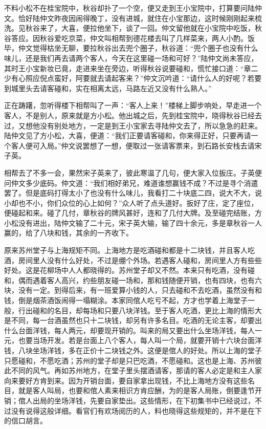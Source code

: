 \documentclass[12pt,UTF8]{ctexbook}
\begin{document}
{{{不料小松不在桂宝院中，秋谷却扑了一个空，便又走到王小宝院中，打算要问陆仲文。恰好陆仲文昨夜因闹得晚丁，没有进城，就住在小宝那边，这时候刚刚起来梳洗。见秋谷来了，大喜，便拉他坐下，谈了一回。仲文留他就在小宝院中吃饭，秋谷答应。因秋谷爱吃京菜，仲文叫相帮到德花楼去叫了几样菜来，两人小酌。饭毕，仲文觉得枯坐无聊，要拉秋谷出去兜个圈子，秋谷道：“兜个圈子也没有什么味儿，还是我们再去请两个客人，今天在这里碰一场和可好？”陆仲文尚未答应，其时王小宝新妆已竟，走进来坐在旁边，听得秋谷说要碰和，慌忙接口道：“章二少有心照应倪点蛮好，阿要就去请起客来？”仲文沉吟道：“请什么人的好呢？若要到城里头去请客碰和，实在相离太远，马路左近又没有什么熟人。”

正在踌躇，忽听得楼下相帮叫了一声：“客人上来！”楼梯上脚步响处，早走进一个客人，不是别人，原来就是方小松。他出城之后，先到桂宝院中，晓得秋谷已经去过，又想他没有别处地方，一定是到王小宝家去寻陆仲文去了，所以急急的赶来。陆仲文见了方小松，大喜，便道：“我们正要请客碰和，你来得正好，只要再请一个客人便可入局。”仲文说罢想了一想，便取过一张请客票来，到石路长安栈去请宋子英。

相帮去了不多一会，果然宋子英来了，彼此寒温了几句，便大家入位扳庄。子英便问仲文多少底码。仲文道：“我们相好弟兄，难道谁想赢钱不成？不过是寻个消遣罢了。但是底码打得太小了也没有什么味儿，我看打二十块底二四，说大不大，说小却也不小，你们众位的心上如何？”众人听了点头道好。扳好了庄，定了座位，便碰起和来。碰了几付，章秋谷的牌风甚好，连和了几付大牌。及至碰完结账，方小松没有进出，陆仲文输了二十元，宋子英大输，输了四十余元，多是章秋谷一人赢的，给了八块和钱，其余的一齐收下。

原来苏州堂子与上海规矩不同。上海地方是吃酒碰和都是十二块钱，并且客人吃酒，房间里人没有什么好处，不过是绷个外场。若遇客人碰和，房间里人方有些些好处。这是花柳场中人人都晓得的。苏州堂子却又不然。本来只有吃酒，没有碰和，偶而遇着客人高兴，约些朋友碰一场和，那和钱随便开销，也有四块，也有六块，没有一定。到得后来，有一班爱算小钱的人，只去碰和不去吃酒，虽然没有和钱，倒是烟茶酒饭闹得一塌糊涂。本家同倌人吃亏不起，方才也学着上海堂子一般，行出碰和的名目，却每场和只要八块洋钱。至于客人吃酒，更比上海的情形大是不同，每一台酒虽然也只十二块钱，却另有许多名目。吃酒的无论主客，却要出什么台面洋钱，每人两元，却要现开销的。叫来的局又要出什么坐场洋钱，每人一元，也要当场开发。若是台面上八个客人，每人叫一个局，就要开销十六块台面洋钱，八块坐场洋钱，多在正价十二块钱之外。这便是倌人的好处。所以上海的堂子只愿碰和，不愿吃酒；苏州的堂子却是只巴吃酒，不愿碰和。这也是上海、苏州彼此不同的风气。再如苏州地方，在堂子里头摆酒请客，那请的客人必定是和主人家向来要好方肯到来。因为开销台面，要自家拿出现钱，不比上海地方没有这些名目，就是客人叫局，也要和倌人素来相识方肯应酬，为的是客人局账，倒要逢节开销；倌人出局的坐场洋钱，先要自家垫出。这些情形，在下初集书中已经说过，不过没有说得这般详细。看官们有欢场阅历的人，料也晓得这些规矩的，并不是在下的信口胡言。

}}}
\end{document}
